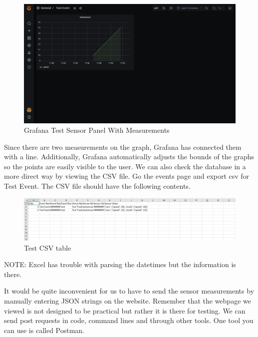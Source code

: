 \documentclass[12pt, letterpaper]{article}
\begin{document}
{{{{{{{{{{{{\begin{figure}[h!]
	\centering
	\includegraphics[width=1\columnwidth]{assets/grafana_with_measurements.png}
	\caption{Grafana Test Sensor Panel With Measurements}
	\end{figure}		
\par Since there are two measurements on the graph, Grafana has connected them with a line. Additionally, Grafana automatically adjusts the bounds of the graphs so the points are easily visible to the user. We can also check the database in a more direct way by viewing the CSV file. Go the events page and export csv for Test Event. The CSV file should have the following contents. 
\begin{figure}[h!]
	\centering
	\includegraphics[width=1\columnwidth]{assets/csv.png}
	\caption{Test CSV table}
	\end{figure}	
\par NOTE: Excel has trouble with parsing the datetimes but the information is there. \\

\par It would be quite inconvenient for us to have to send the sensor measurements by manually entering JSON strings on the website. Remember that the webpage we viewed is not designed to be practical but rather it is there for testing. We can send post requests in code, command lines and through other tools. One tool you can use is called Postman. 

}}}}}}}}}}}}
\end{document}
